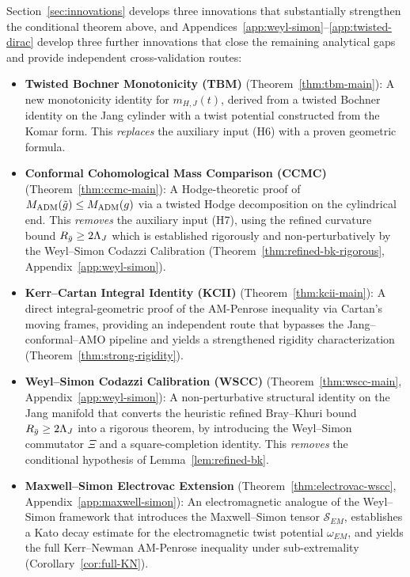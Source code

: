 Section~\ref{sec:innovations} develops three innovations that substantially strengthen the conditional theorem above, and Appendices~\ref{app:weyl-simon}--\ref{app:twisted-dirac} develop three further innovations that close the remaining analytical gaps and provide independent cross-validation routes:
\begin{itemize}[leftmargin=1.5em, itemsep=2pt]
    \item \textbf{Twisted Bochner Monotonicity (TBM)} (Theorem~\ref{thm:tbm-main}): A new monotonicity identity for $m_{H,J}(t)$, derived from a twisted Bochner identity on the Jang cylinder with a twist potential constructed from the Komar form. This \emph{replaces} the auxiliary input (H6) with a proven geometric formula.
    \item \textbf{Conformal Cohomological Mass Comparison (CCMC)} (Theorem~\ref{thm:ccmc-main}): A Hodge-theoretic proof of $M_{\mathrm{ADM}}(\tilde{g}) \leq M_{\mathrm{ADM}}(g)$ via a twisted Hodge decomposition on the cylindrical end. This \emph{removes} the auxiliary input (H7), using the refined curvature bound $R_{\bar{g}} \geq 2\Lambda_J$ which is established rigorously and non-perturbatively by the Weyl--Simon Codazzi Calibration (Theorem~\ref{thm:refined-bk-rigorous}, Appendix~\ref{app:weyl-simon}).
    \item \textbf{Kerr--Cartan Integral Identity (KCII)} (Theorem~\ref{thm:kcii-main}): A direct integral-geometric proof of the AM-Penrose inequality via Cartan's moving frames, providing an independent route that bypasses the Jang--conformal--AMO pipeline and yields a strengthened rigidity characterization (Theorem~\ref{thm:strong-rigidity}).
    \item \textbf{Weyl--Simon Codazzi Calibration (WSCC)} (Theorem~\ref{thm:wscc-main}, Appendix~\ref{app:weyl-simon}): A non-perturbative structural identity on the Jang manifold that converts the heuristic refined Bray--Khuri bound $R_{\bar{g}} \geq 2\Lambda_J$ into a rigorous theorem, by introducing the Weyl--Simon commutator $\Xi$ and a square-completion identity. This \emph{removes} the conditional hypothesis of Lemma~\ref{lem:refined-bk}.
    \item \textbf{Maxwell--Simon Electrovac Extension} (Theorem~\ref{thm:electrovac-wscc}, Appendix~\ref{app:maxwell-simon}): An electromagnetic analogue of the Weyl--Simon framework that introduces the Maxwell--Simon tensor $\mathcal{S}_{EM}$, establishes a Kato decay estimate for the electromagnetic twist potential $\omega_{EM}$, and yields the full Kerr--Newman AM-Penrose inequality under sub-extremality (Corollary~\ref{cor:full-KN}).

\end{itemize}

